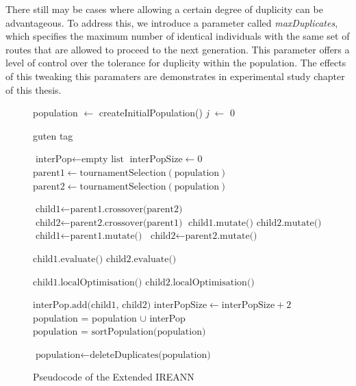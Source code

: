 \documentclass[twoside]{ctuthesis}
\theoremstyle{plain}
\theoremstyle{definition}
\theoremstyle{note}
\begin{document}
There still may be cases where allowing a certain degree of duplicity can be advantageous. To address this, we introduce a parameter called \emph{maxDuplicates}, which specifies the maximum number of identical individuals with the same set of routes that are allowed to proceed to the next generation. This parameter offers a level of control over the tolerance for duplicity within the population. The effects of this tweaking this paramaters are demonstrates in experimental study chapter of this thesis.

\begin{figure}
	\begin{algorithmic}[1]
		\State population $\gets$ createInitialPopulation()
		\State \emph{j} $\gets$ 0
		
		\State guten tag
		\EndIf
		
		
		\State $\text{interPop} \gets \text{empty list}$
		\State $\text{interPopSize} \gets 0$
		\State $\text{parent1} \gets \text{tournamentSelection}(\text{population})$
		\State $\text{parent2} \gets \text{tournamentSelection}(\text{population})$
		
		\State $\text{child1} \gets \text{parent1.crossover(parent2)}$
		\State $\text{child2} \gets \text{parent2.crossover(parent1)}$
		\State $\text{child1.mutate()}$
		\State $\text{child2.mutate()}$
		\EndIf
		\Else
		\State $\text{child1} \gets \text{parent1.mutate()}$
		\State $\text{child2} \gets \text{parent2.mutate()}$
		\EndIf
		
		\State $\text{child1.evaluate()}$
		\State $\text{child2.evaluate()}$
		
		\State $\text{child1.localOptimisation()}$
		\State $\text{child2.localOptimisation()}$
		
		\State $\text{interPop.add(child1, child2)}$
		\State $\text{interPopSize} \gets \text{interPopSize} + 2$
		\EndWhile
		\State population = population $\cup$ interPop
		\State $\text{population = sortPopulation(population)}$
		
		\State $\text{population} \gets \text{deleteDuplicates(population)}$
		\EndFor
		
		
		
	\end{algorithmic}
	\caption{Pseudocode of the Extended IREANN}
	\label{fig:evoalg}
	
\end{figure}
\end{document}
